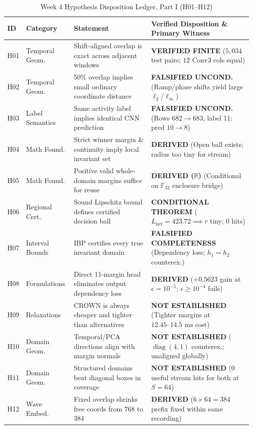 \documentclass[11pt,oneside,a4paper]{report}
\newcommand{\R}{\mathbb{R}}
\newcommand{\F}{\mathbb{F}}
\newcommand{\code}[1]{{\small\upshape\ttfamily #1}}
\newcommand{\diag}{\operatorname{diag}}
\theoremstyle{remark}
\begin{document}
\begin{table}[htbp]
\centering\small
\caption{Week 4 Hypothesis Disposition Ledger, Part I (\code{H01}--\code{H12})}
\label{tab:app_h1}
\begin{tabularx}{\textwidth}{@{}P{1.1cm}P{2.5cm}YY@{}}
\toprule
\textbf{ID} & \textbf{Category} & \textbf{Statement} & \textbf{Verified Disposition \& Primary Witness} \\
\midrule
\code{H01} & Temporal Geom. & Shift-aligned overlap is exact across adjacent windows & \textbf{VERIFIED FINITE} ($5,034$ test pairs; $12$ Conv3 cols equal) \\
\code{H02} & Temporal Geom. & 50\% overlap implies small ordinary coordinate distance & \textbf{FALSIFIED UNCOND.} (Ramp/phase shifts yield large $\ell_2$/$\ell_\infty$) \\
\code{H03} & Label Semantics & Same activity label implies identical CNN prediction & \textbf{FALSIFIED UNCOND.} (Rows $682\to 683$, label 11: pred $10\to 8$) \\
\code{H04} & Math Found. & Strict winner margin \& continuity imply local invariant set & \textbf{DERIVED} (Open ball exists; radius too tiny for stream) \\
\code{H05} & Math Found. & Positive valid whole-domain margins suffice for reuse & \textbf{DERIVED ($\R$)} (Conditional on $\F_{32}$ enclosure bridge) \\
\code{H06} & Regional Cert. & Sound Lipschitz bound defines certified decision ball & \textbf{CONDITIONAL THEOREM} ($L_{\text{net}}=423.72 \implies r$ tiny; $0$ hits) \\
\code{H07} & Interval Bounds & IBP certifies every true invariant domain & \textbf{FALSIFIED COMPLETENESS} (Dependency loss; $h_1=h_2$ counterex.) \\
\code{H08} & Formulations & Direct 11-margin head eliminates output dependency loss & \textbf{DERIVED} ($+0.5623$ gain at $\epsilon=10^{-5}$; $\epsilon\ge 10^{-4}$ fails) \\
\code{H09} & Relaxations & CROWN is always cheaper and tighter than alternatives & \textbf{NOT ESTABLISHED} (Tighter margins at $12.45\text{--}14.5\text{ ms}$ cost) \\
\code{H10} & Domain Geom. & Temporal/PCA directions align with margin normals & \textbf{NOT ESTABLISHED} ($\diag(4,1)$ counterex.; unaligned globally) \\
\code{H11} & Domain Geom. & Structured domains beat diagonal boxes in coverage & \textbf{NOT ESTABLISHED} ($0$ useful stream hits for both at $S=64$) \\
\code{H12} & Wave Embed. & Fixed overlap shrinks free coords from $768$ to $384$ & \textbf{DERIVED} ($6\times 64 = 384$ prefix fixed within same recording) \\
\bottomrule
\end{tabularx}
\end{table}
\end{document}
